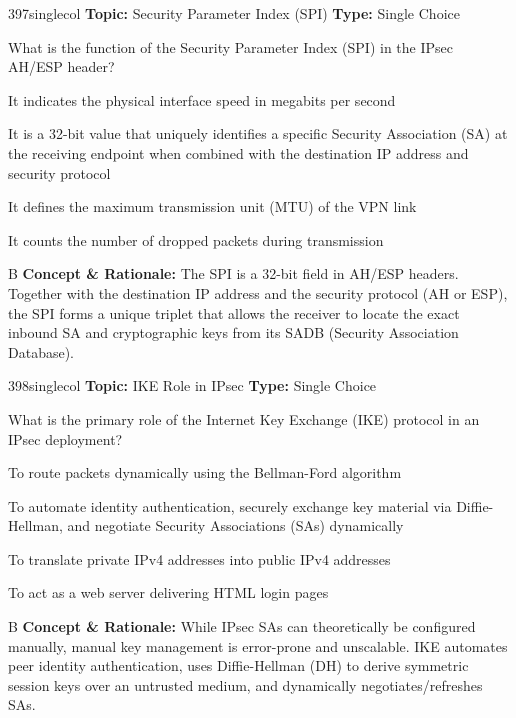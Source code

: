 \begin{qcard}{397}{singlecol}
\textcolor{darkslate!75}{\small\textbf{Topic:} Security Parameter Index (SPI) \hfill \textbf{Type:} Single Choice}\vspace{0.4em}\par
What is the function of the Security Parameter Index (SPI) in the IPsec AH/ESP header?
\begin{qoptions}
\item It indicates the physical interface speed in megabits per second
\item It is a 32-bit value that uniquely identifies a specific Security Association (SA) at the receiving endpoint when combined with the destination IP address and security protocol
\item It defines the maximum transmission unit (MTU) of the VPN link
\item It counts the number of dropped packets during transmission
\end{qoptions}
\end{qcard}
\nopagebreak
\begin{explainbox}{B}
\textbf{Concept \& Rationale:} The SPI is a 32-bit field in AH/ESP headers. Together with the destination IP address and the security protocol (AH or ESP), the SPI forms a unique triplet that allows the receiver to locate the exact inbound SA and cryptographic keys from its SADB (Security Association Database).
\end{explainbox}

\begin{qcard}{398}{singlecol}
\textcolor{darkslate!75}{\small\textbf{Topic:} IKE Role in IPsec \hfill \textbf{Type:} Single Choice}\vspace{0.4em}\par
What is the primary role of the Internet Key Exchange (IKE) protocol in an IPsec deployment?
\begin{qoptions}
\item To route packets dynamically using the Bellman-Ford algorithm
\item To automate identity authentication, securely exchange key material via Diffie-Hellman, and negotiate Security Associations (SAs) dynamically
\item To translate private IPv4 addresses into public IPv4 addresses
\item To act as a web server delivering HTML login pages
\end{qoptions}
\end{qcard}
\nopagebreak
\begin{explainbox}{B}
\textbf{Concept \& Rationale:} While IPsec SAs can theoretically be configured manually, manual key management is error-prone and unscalable. IKE automates peer identity authentication, uses Diffie-Hellman (DH) to derive symmetric session keys over an untrusted medium, and dynamically negotiates/refreshes SAs.
\end{explainbox}

